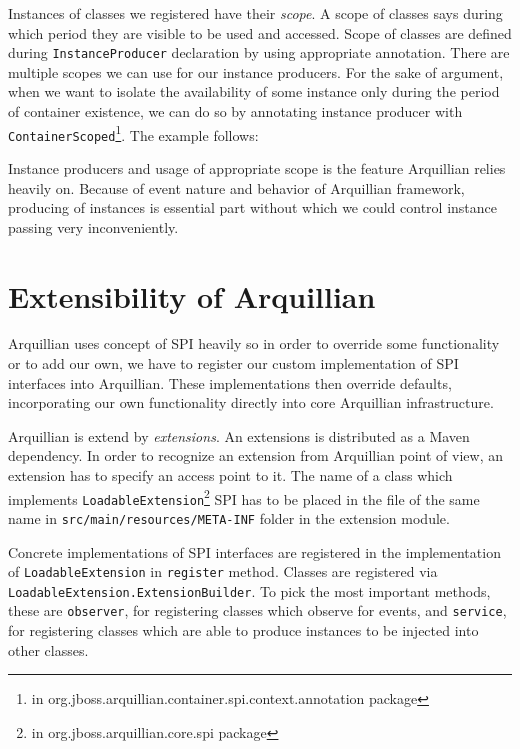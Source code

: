 \documentclass[12pt,final,oneside]{fithesis}
\begin{document}
Instances of classes we registered have their \textit{scope}. A scope of classes says during which period they are visible to be used and accessed. Scope of classes are defined during \texttt{InstanceProducer} declaration by using appropriate annotation. There are multiple scopes we can use for our instance producers. For the sake of argument, when we want to isolate the availability of some instance only during the period of container existence, we can do so by annotating instance producer with \texttt{ContainerScoped}\footnote{in org.jboss.arquillian.container.spi.context.annotation package}. The example follows:



Instance producers and usage of appropriate scope is the feature Arquillian relies heavily on. Because of event nature and behavior of Arquillian framework, producing of instances is essential part without which we could control instance passing very inconveniently.

	\section{Extensibility of Arquillian}

Arquillian uses concept of SPI\cite{bib072} heavily so in order to override some functionality or to add our own, we have to register our custom implementation of SPI interfaces into Arquillian. These implementations then override defaults, incorporating our own functionality directly into core Arquillian infrastructure.

Arquillian is extend by \textit{extensions}. An extensions is distributed as a Maven dependency. In order to recognize an extension from Arquillian point of view, an extension has to specify an access point to it. The name of a class which implements \texttt{LoadableExtension}\footnote{in org.jboss.arquillian.core.spi package} SPI has to be placed in the file of the same name in \texttt{src/main/resources/META-INF} folder in the extension module.

Concrete implementations of SPI interfaces are registered in the implementation of \texttt{LoadableExtension} in \texttt{register} method. Classes are registered via \texttt{LoadableExtension.ExtensionBuilder}. To pick the most important methods, these are \texttt{observer}, for registering classes which observe for events, and \texttt{service}, for registering classes which are able to produce instances to be injected into other classes.
\end{document}
